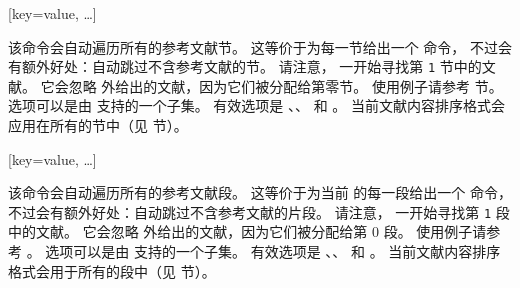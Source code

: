 \begin{ltxsyntax}

[key=value, \dots]


该命令会自动遍历所有的参考文献节。
这等价于为每一节给出一个  命令，
不过会有额外好处：自动跳过不含参考文献的节。
请注意， 一开始寻找第 \texttt{1} 节中的文献。
它会忽略  外给出的文献，因为它们被分配给第零节。
使用例子请参考  节。
选项可以是由  支持的一个子集。
有效选项是 、、 和 。
当前文献内容排序格式会应用在所有的节中（见  节）。

[key=value, \dots]


该命令会自动遍历所有的参考文献段。
这等价于为当前  的每一段给出一个  命令，不过会有额外好处：自动跳过不含参考文献的片段。
请注意， 一开始寻找第 \texttt{1} 段中的文献。
它会忽略  外给出的文献，因为它们被分配给第 0 段。
使用例子请参考 。
选项可以是由  支持的一个子集。
有效选项是 、、 和 。
当前文献内容排序格式会用于所有的段中（见  节）。


\end{ltxsyntax}
